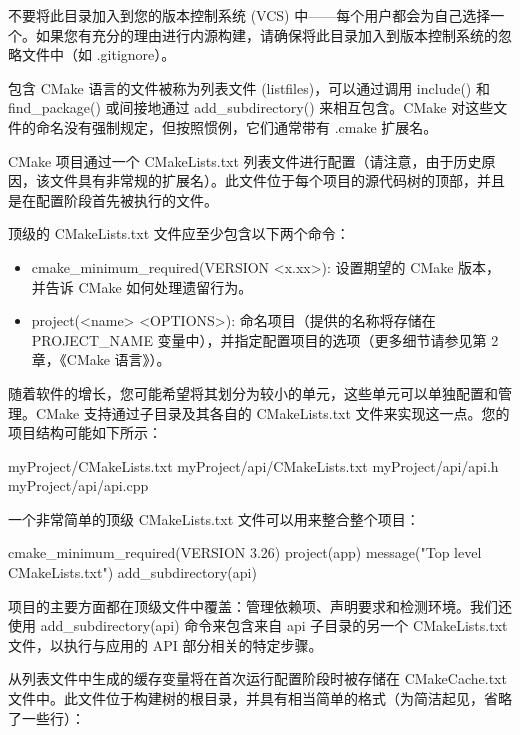 不要将此目录加入到您的版本控制系统 (VCS) 中——每个用户都会为自己选择一个。如果您有充分的理由进行内源构建，请确保将此目录加入到版本控制系统的忽略文件中（如 .gitignore）。


包含 CMake 语言的文件被称为列表文件 (listfiles)，可以通过调用 include() 和 find\_package() 或间接地通过 add\_subdirectory() 来相互包含。CMake 对这些文件的命名没有强制规定，但按照惯例，它们通常带有 .cmake 扩展名。


CMake 项目通过一个 CMakeLists.txt 列表文件进行配置（请注意，由于历史原因，该文件具有非常规的扩展名）。此文件位于每个项目的源代码树的顶部，并且是在配置阶段首先被执行的文件。

顶级的 CMakeLists.txt 文件应至少包含以下两个命令：

\begin{itemize}
\item
cmake\_minimum\_required(VERSION <x.xx>): 设置期望的 CMake 版本，并告诉 CMake 如何处理遗留行为。

\item
project(<name> <OPTIONS>): 命名项目（提供的名称将存储在 PROJECT\_NAME 变量中），并指定配置项目的选项（更多细节请参见第 2 章，《CMake 语言》）。
\end{itemize}

随着软件的增长，您可能希望将其划分为较小的单元，这些单元可以单独配置和管理。CMake 支持通过子目录及其各自的 CMakeLists.txt 文件来实现这一点。您的项目结构可能如下所示：

\begin{shell}
myProject/CMakeLists.txt
myProject/api/CMakeLists.txt
myProject/api/api.h
myProject/api/api.cpp
\end{shell}

一个非常简单的顶级 CMakeLists.txt 文件可以用来整合整个项目：

\begin{cmake}
cmake_minimum_required(VERSION 3.26)
project(app)
message("Top level CMakeLists.txt")
add_subdirectory(api)
\end{cmake}

项目的主要方面都在顶级文件中覆盖：管理依赖项、声明要求和检测环境。我们还使用 add\_subdirectory(api) 命令来包含来自 api 子目录的另一个 CMakeLists.txt 文件，以执行与应用的 API 部分相关的特定步骤。


从列表文件中生成的缓存变量将在首次运行配置阶段时被存储在 CMakeCache.txt 文件中。此文件位于构建树的根目录，并具有相当简单的格式（为简洁起见，省略了一些行）：


